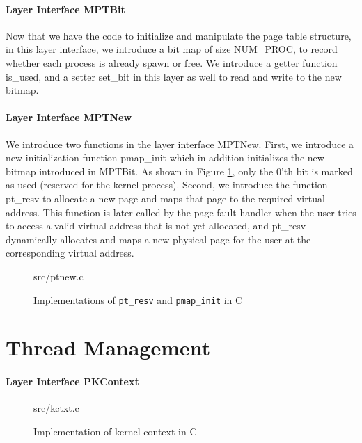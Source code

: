 \paragraph{Layer Interface MPTBit}

Now that we have the code to initialize and manipulate the page table structure, in this layer interface,
we introduce a bit map of size \textsf{NUM\_PROC}, to record whether each process is already spawn or
free. We introduce a getter function \textsf{is\_used}, and a setter \textsf{set\_bit} in this layer as well to
read and write to the new bitmap.


\paragraph{Layer Interface MPTNew}

We introduce two functions in the layer interface MPTNew.
First, we introduce a new initialization function \textsf{pmap\_init} which in addition initializes the new bitmap introduced in MPTBit.
As shown in Figure \ref{fig:ptnew_c}, only the 0'th bit is marked as used (reserved for the kernel process).
Second, we introduce the function \textsf{pt\_resv} to allocate a new page and maps that page to the required virtual address.
This function is later called by the page fault handler when the user tries to access a valid virtual address that is not yet allocated,
and \textsf{pt\_resv} dynamically allocates and maps a new physical page for the user at the corresponding virtual address.

\begin{figure}
	 {src/ptnew.c}
	\caption{Implementations of \texttt{pt\_resv} and \texttt{pmap\_init} in C}
	\label{fig:ptnew_c}
\end{figure}


\section{Thread Management}

\paragraph{Layer Interface PKContext}

\begin{figure}
	 {src/kctxt.c}
	\caption{Implementation of kernel context in C}
	\label{fig:kctxt_c}
\end{figure}

